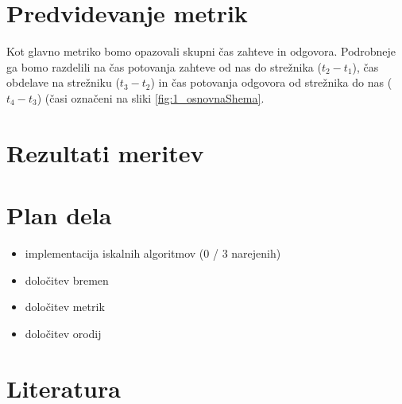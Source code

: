 \section{Predvidevanje metrik}
Kot glavno metriko bomo opazovali skupni čas zahteve in odgovora. Podrobneje ga bomo razdelili na čas potovanja zahteve od nas do strežnika ($t_2 - t_1$), čas obdelave na strežniku ($t_3 - t_2$) in čas potovanja odgovora od strežnika do nas ($t_4 - t_3$) (časi označeni na sliki \ref{fig:1_osnovnaShema}.

\section{Rezultati meritev}

\section{Plan dela}
\begin{itemize}
\item implementacija iskalnih algoritmov (0 / 3 narejenih)
\item določitev bremen
\item določitev metrik
\item določitev orodij
\end{itemize}

\section{Literatura}

%
%

